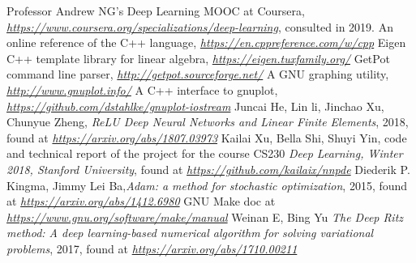 \documentclass[12pt, a4paper]{report}
\theoremstyle{definition}
\begin{document}
\newpage
\begin{thebibliography}{10}
	
	 Professor Andrew NG's Deep Learning MOOC at Coursera, \href{https://www.coursera.org/specializations/deep-learning}{\emph{https://www.coursera.org/specializations/deep-learning}}, consulted in 2019.
	 An online reference of the C++ language, \href{https://en.cppreference.com/w/cpp}{\emph{https://en.cppreference.com/w/cpp}}
	 Eigen C++ template library for linear algebra, \href{https://eigen.tuxfamily.org/}{\emph{https://eigen.tuxfamily.org/}}
	 GetPot command line parser, \href{http://getpot.sourceforge.net/}{\emph{http://getpot.sourceforge.net/}}
	 A GNU graphing utility, \href{http://www.gnuplot.info/}{\emph{http://www.gnuplot.info/}}
	 A C++ interface to gnuplot, \href{https://github.com/dstahlke/gnuplot-iostream}{\emph{https://github.com/dstahlke/gnuplot-iostream}}
	 Juncai He, Lin li, Jinchao Xu, Chunyue Zheng, \emph{ReLU Deep Neural Networks and Linear Finite Elements}, 2018, found at \href{https://arxiv.org/abs/1807.03973}{\emph{https://arxiv.org/abs/1807.03973}}
	 Kailai Xu, Bella Shi, Shuyi Yin, code and technical report of the project for the course CS230 \emph{Deep Learning, Winter 2018, Stanford University}, found at \href{https://github.com/kailaix/nnpde}{\emph{https://github.com/kailaix/nnpde}}
	 Diederik P. Kingma, Jimmy Lei Ba,\emph{Adam: a method for stochastic optimization}, 2015, found at
	\href{https://arxiv.org/abs/1412.6980}{\emph{https://arxiv.org/abs/1412.6980}} 
	 GNU Make doc at \href{https://www.gnu.org/software/make/manual}{\emph{https://www.gnu.org/software/make/manual}}
	 Weinan E, Bing Yu \emph{The Deep Ritz method: A deep learning-based numerical algorithm for solving variational problems}, 2017, found at \href{https://arxiv.org/abs/1710.00211}{\emph{https://arxiv.org/abs/1710.00211}}
	
\end{thebibliography}
\end{document}
